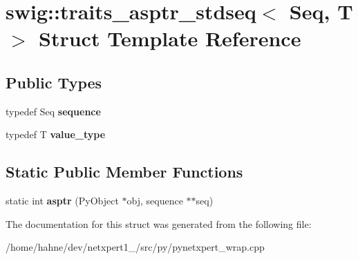 \hypertarget{structswig_1_1traits__asptr__stdseq}{}\section{swig\+:\+:traits\+\_\+asptr\+\_\+stdseq$<$ Seq, T $>$ Struct Template Reference}
\label{structswig_1_1traits__asptr__stdseq}
\subsection*{Public Types}
\begin{DoxyCompactItemize}
\item 
typedef Seq {\bfseries sequence}\hypertarget{structswig_1_1traits__asptr__stdseq_acc3237a1f41e649f169c938930068a35}{}\label{structswig_1_1traits__asptr__stdseq_acc3237a1f41e649f169c938930068a35}

\item 
typedef T {\bfseries value\+\_\+type}\hypertarget{structswig_1_1traits__asptr__stdseq_a18bb424b58bc29aa995ff6d246499ee5}{}\label{structswig_1_1traits__asptr__stdseq_a18bb424b58bc29aa995ff6d246499ee5}

\end{DoxyCompactItemize}
\subsection*{Static Public Member Functions}
\begin{DoxyCompactItemize}
\item 
static int {\bfseries asptr} (Py\+Object $\ast$obj, sequence $\ast$$\ast$seq)\hypertarget{structswig_1_1traits__asptr__stdseq_a20c63611de0e0b36a51bf9b1ff41af48}{}\label{structswig_1_1traits__asptr__stdseq_a20c63611de0e0b36a51bf9b1ff41af48}

\end{DoxyCompactItemize}


The documentation for this struct was generated from the following file\+:\begin{DoxyCompactItemize}
\item 
/home/hahne/dev/netxpert1\+\_/src/py/pynetxpert\+\_\+wrap.\+cpp\end{DoxyCompactItemize}
